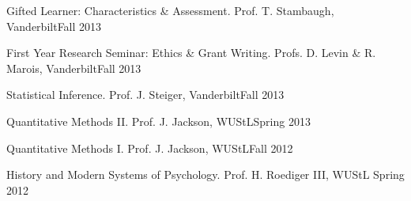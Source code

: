 \begin{etaremune}
\item Gifted Learner: Characteristics \& Assessment. Prof. T. Stambaugh, Vanderbilt\hfill{Fall 2013}
\item First Year Research Seminar: Ethics \& Grant Writing. Profs. D. Levin \& R. Marois, Vanderbilt\hfill{Fall 2013}
\item Statistical Inference. Prof. J. Steiger, Vanderbilt\hfill{Fall 2013}
\item Quantitative Methods \textrm{II}. Prof. J. Jackson, WUStL\hfill{Spring 2013}
\item Quantitative Methods \textrm{I}. Prof. J. Jackson, WUStL\hfill{Fall 2012}
\item History and Modern Systems of Psychology. Prof. H. Roediger \textrm{III}, WUStL \hfill{Spring 2012}\end{etaremune}